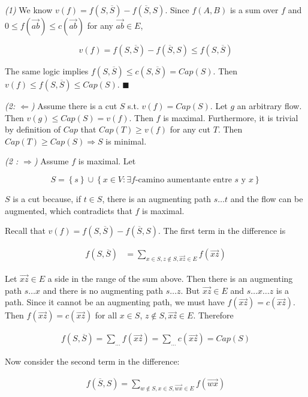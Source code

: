 \documentclass[a4paper]{article}
\begin{document}
\textit{(1)} We know $v(f) = f(S, \overline{S}) - f(\overline{S}, S)$. Since
$f(A, B)$ is a sum over $f$ and $0 \leq f(\overrightarrow{ab}) \leq
c(\overrightarrow{ab})$ for any $\overrightarrow{ab} \in E$, 

$$v(f) = f(S, \overline{S}) - f(\overline{S}, S) \leq f(S, \overline{S})$$

The same logic implies $f(S, \overline{S}) \leq c(S, \overline{S}) = Cap(S)$.
Then $v(f) \leq f(S, \overline{S}) \leq Cap(S)$. $\blacksquare$

\textit{(2: $\Leftarrow$)} Assume there is a cut $S$ s.t. $v(f) = Cap(S)$. Let
$g$ an arbitrary flow. Then $v(g) \leq Cap(S) = v(f)$. Then $f$ is maximal.
Furthermore, it is trivial by definition of $Cap$ that $Cap(T) \geq v(f)$ for
any cut $T$. Then $Cap(T) \geq Cap(S) \Rightarrow S$ is minimal.

\textit{(2 : $\Rightarrow$)} Assume $f$ is maximal. Let

$$
S = \left\{ s \right\} \cup \left\{ x \in V : \exists f\text{-camino
aumentante entre $s$ y $x$} \right\} 
$$

$S$ is a cut because, if $t \in S$, there is an augmenting path 
$s \ldots t$ and the flow can be augmented, which contradicts 
that $f$ is maximal.

Recall that $v(f) = f(S, \overline{S}) - f(\overline{S},S)$. The first 
term in the difference is

\begin{align*}
    f(S, \overline{S}) &= \sum_{x \in S, z \not\in S, \overrightarrow{xz} \in E}
    f(\overrightarrow{xz})
\end{align*}

Let $\overrightarrow{xz} \in E$ a side in the range of the sum above.
Then there is an augmenting path $s \ldots x$ and there is no 
augmenting path $s \ldots z$. But $\overrightarrow{xz} \in E$ and 
$s\ldots x \ldots z$ is a path. Since it cannot be an augmenting path,
we must have $f(\overrightarrow{xz}) = c(\overrightarrow{xz})$. 
Then $f(\overrightarrow{xz}) = c(\overrightarrow{xz})$ for all $x \in S$, $z
\not\in S, \overrightarrow{xz}\in E$. Therefore

\begin{align*}
    f(S, \overline{S}) = \sum_{\ldots} f(\overrightarrow{xz}) = \sum_{\ldots}
    c(\overrightarrow{xz}) = Cap(S)
\end{align*}

Now consider the second term in the difference:

\begin{align*}
    f(\overline{S}, S) = \sum_{w \not\in S, x \in S, \overrightarrow{wx} \in E}
    f(\overrightarrow{wx})
\end{align*}
\end{document}
